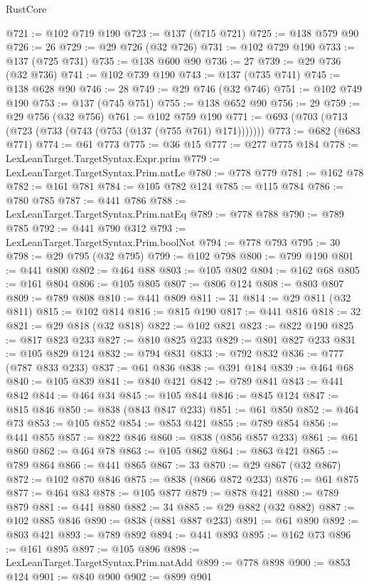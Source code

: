\begin{lexlean}{RustCore}
\begin{coremodule}
{\begin{coremodule}
{{{{{{{{{{{{{{{{{{{{{{{{{{{{{{{{{{{{{{{{{{{{{{{@721 := @102 @719 @190
@723 := @137 (@715 @721)
@725 := @138 @579 @90
@726 := 26
@729 := @29 @726 (@32 @726)
@731 := @102 @729 @190
@733 := @137 (@725 @731)
@735 := @138 @600 @90
@736 := 27
@739 := @29 @736 (@32 @736)
@741 := @102 @739 @190
@743 := @137 (@735 @741)
@745 := @138 @628 @90
@746 := 28
@749 := @29 @746 (@32 @746)
@751 := @102 @749 @190
@753 := @137 (@745 @751)
@755 := @138 @652 @90
@756 := 29
@759 := @29 @756 (@32 @756)
@761 := @102 @759 @190
@771 := @693 (@703 (@713 (@723 (@733 (@743 (@753 (@137 (@755 @761) @171)))))))
@773 := @682 (@683 @771)
@774 := @61 @773
@775 := @36 @15
@777 := @277 @775 @184
@778 := LexLeanTarget.TargetSyntax.Expr.prim
@779 := LexLeanTarget.TargetSyntax.Prim.natLe
@780 := @778 @779
@781 := @162 @78
@782 := @161 @781
@784 := @105 @782 @124
@785 := @115 @784
@786 := @780 @785
@787 := @441 @786
@788 := LexLeanTarget.TargetSyntax.Prim.natEq
@789 := @778 @788
@790 := @789 @785
@792 := @441 @790 @312
@793 := LexLeanTarget.TargetSyntax.Prim.boolNot
@794 := @778 @793
@795 := 30
@798 := @29 @795 (@32 @795)
@799 := @102 @798
@800 := @799 @190
@801 := @441 @800
@802 := @464 @88
@803 := @105 @802
@804 := @162 @68
@805 := @161 @804
@806 := @105 @805
@807 := @806 @124
@808 := @803 @807
@809 := @789 @808
@810 := @441 @809
@811 := 31
@814 := @29 @811 (@32 @811)
@815 := @102 @814
@816 := @815 @190
@817 := @441 @816
@818 := 32
@821 := @29 @818 (@32 @818)
@822 := @102 @821
@823 := @822 @190
@825 := @817 @823 @233
@827 := @810 @825 @233
@829 := @801 @827 @233
@831 := @105 @829 @124
@832 := @794 @831
@833 := @792 @832
@836 := @777 (@787 @833 @233)
@837 := @61 @836
@838 := @391 @184
@839 := @464 @68
@840 := @105 @839
@841 := @840 @421
@842 := @789 @841
@843 := @441 @842
@844 := @464 @34
@845 := @105 @844
@846 := @845 @124
@847 := @815 @846
@850 := @838 (@843 @847 @233)
@851 := @61 @850
@852 := @464 @73
@853 := @105 @852
@854 := @853 @421
@855 := @789 @854
@856 := @441 @855
@857 := @822 @846
@860 := @838 (@856 @857 @233)
@861 := @61 @860
@862 := @464 @78
@863 := @105 @862
@864 := @863 @421
@865 := @789 @864
@866 := @441 @865
@867 := 33
@870 := @29 @867 (@32 @867)
@872 := @102 @870 @846
@875 := @838 (@866 @872 @233)
@876 := @61 @875
@877 := @464 @83
@878 := @105 @877
@879 := @878 @421
@880 := @789 @879
@881 := @441 @880
@882 := 34
@885 := @29 @882 (@32 @882)
@887 := @102 @885 @846
@890 := @838 (@881 @887 @233)
@891 := @61 @890
@892 := @803 @421
@893 := @789 @892
@894 := @441 @893
@895 := @162 @73
@896 := @161 @895
@897 := @105 @896
@898 := LexLeanTarget.TargetSyntax.Prim.natAdd
@899 := @778 @898
@900 := @853 @124
@901 := @840 @900
@902 := @899 @901
}}}}}}}}}}}}}}}}}}}}}}}}}}}}}}}}}}}}}}}}}}}}}}}
\end{coremodule}}
\end{coremodule}
\end{lexlean}
